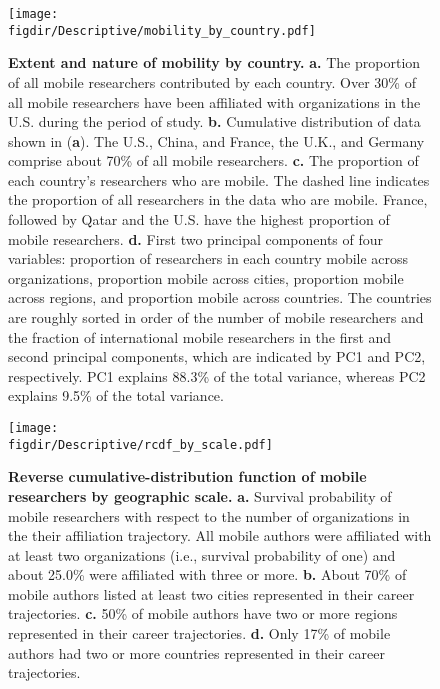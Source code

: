 \documentclass[12pt]{article} %
\def\figdir{../Figs}
\begin{document}
%
%
\begin{figure}[p!]
	\centering
	\texttt{[image: \\figdir/Descriptive/mobility\_by\_country.pdf]}
	\caption{
		\textbf{Extent and nature of mobility by country.}
		\textbf{a.}
		The proportion of all mobile researchers contributed by each country. 
		Over 30\% of all mobile researchers have been affiliated with organizations in the U.S. during the period of study.
		\textbf{b.}
		Cumulative distribution of data shown in (\textbf{a}).
		The U.S., China, and France, the U.K., and Germany comprise about 70\% of all mobile researchers. 
		\textbf{c.} 
		The proportion of each country's researchers who are mobile.
		The dashed line indicates the proportion of all researchers in the data who are mobile. 
		France, followed by Qatar and the U.S. have the highest proportion of mobile researchers. 
		\textbf{d.} First two principal components of four variables: proportion of researchers in each country mobile across organizations, proportion mobile across cities, proportion mobile across regions, and proportion mobile across countries.
		The countries are roughly sorted in order of the number of mobile researchers and the fraction of international mobile researchers in the first and second principal components, which are indicated by PC1 and PC2, respectively. 
		PC1 explains 88.3\% of the total variance, whereas PC2 explains 9.5\% of the total variance. 
	}
	\label{fig:supp:descriptives}
\end{figure}




\newpage
%
%
\begin{figure}[p!]
	\centering
	\texttt{[image: \\figdir/Descriptive/rcdf\_by\_scale.pdf]}
	\caption{
		\textbf{Reverse cumulative-distribution function of mobile researchers by geographic scale.}
		\textbf{a.}
		Survival probability of mobile researchers with respect to the number of organizations in the their affiliation trajectory.
		All mobile authors were affiliated with at least two organizations (i.e., survival probability of one) and about 25.0\% were affiliated with three or more. 
		\textbf{b.} About 70\% of mobile authors listed at least two cities represented in their career trajectories.
		\textbf{c.} 50\% of mobile authors have two or more regions represented in their career trajectories.
		\textbf{d.} Only 17\% of mobile authors had two or more countries represented in their career trajectories.
	}
	\label{fig:supp:rcdf_by_scale}
\end{figure}
\end{document}
